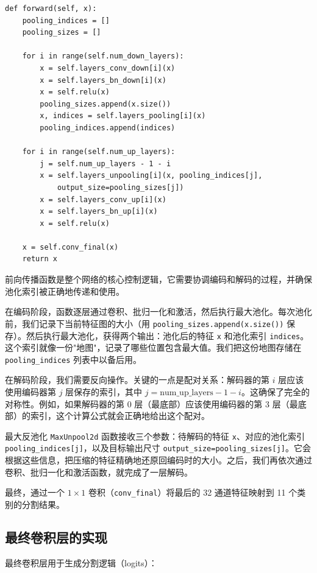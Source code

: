 \documentclass[a4paper]{article}
\begin{document}
\begin{lstlisting}
def forward(self, x):
    pooling_indices = []
    pooling_sizes = []
    
    for i in range(self.num_down_layers):
        x = self.layers_conv_down[i](x)
        x = self.layers_bn_down[i](x)
        x = self.relu(x)
        pooling_sizes.append(x.size())
        x, indices = self.layers_pooling[i](x)
        pooling_indices.append(indices)
    
    for i in range(self.num_up_layers):
        j = self.num_up_layers - 1 - i
        x = self.layers_unpooling[i](x, pooling_indices[j], 
            output_size=pooling_sizes[j])
        x = self.layers_conv_up[i](x)
        x = self.layers_bn_up[i](x)
        x = self.relu(x)
    
    x = self.conv_final(x)
    return x
\end{lstlisting}

前向传播函数是整个网络的核心控制逻辑，它需要协调编码和解码的过程，并确保池化索引被正确地传递和使用。

在编码阶段，函数逐层通过卷积、批归一化和激活，然后执行最大池化。每次池化前，我们记录下当前特征图的大小（用 \texttt{pooling\_sizes.append(x.size())} 保存）。然后执行最大池化，获得两个输出：池化后的特征 \texttt{x} 和池化索引 \texttt{indices}。这个索引就像一份"地图"，记录了哪些位置包含最大值。我们把这份地图存储在 \texttt{pooling\_indices} 列表中以备后用。

在解码阶段，我们需要反向操作。关键的一点是配对关系：解码器的第 $i$ 层应该使用编码器第 $j$ 层保存的索引，其中 $j = \text{num\_up\_layers} - 1 - i$。这确保了完全的对称性。例如，如果解码器的第 0 层（最底部）应该使用编码器的第 3 层（最底部）的索引，这个计算公式就会正确地给出这个配对。

最大反池化 \texttt{MaxUnpool2d} 函数接收三个参数：待解码的特征 \texttt{x}、对应的池化索引 \texttt{pooling\_indices[j]}，以及目标输出尺寸 \texttt{output\_size=pooling\_sizes[j]}。它会根据这些信息，把压缩的特征精确地还原回编码时的大小。之后，我们再依次通过卷积、批归一化和激活函数，就完成了一层解码。

最终，通过一个 $1 \times 1$ 卷积（\texttt{conv\_final}）将最后的 32 通道特征映射到 11 个类别的分割结果。

\subsection{最终卷积层的实现}

最终卷积层用于生成分割逻辑（logits）：
\end{document}
